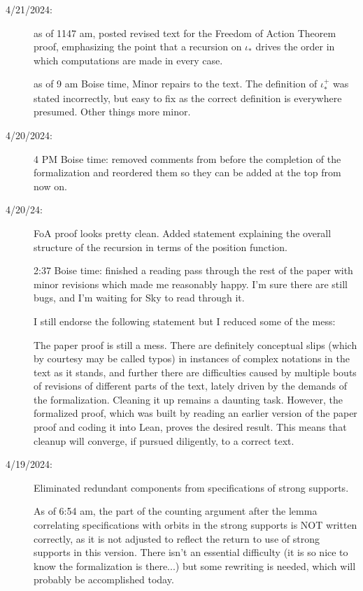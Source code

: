 \documentclass[112pt]{article}
\begin{document}
\begin{description}
\item[4/21/2024:]  as of 1147 am, posted revised text for the Freedom of Action Theorem proof, emphasizing the point that a recursion on $\iota_*$ drives the order in which computations are made in every case.

as of 9 am Boise time, Minor repairs to the text.  The definition of $\iota_*^+$ was stated incorrectly, but easy to fix as the correct definition is everywhere presumed.  Other things more minor.

\item[4/20/2024:] 4 PM Boise time:  removed comments from before the completion of the formalization and reordered them so they can be added at the top from now on.

\item[4/20/24:]  FoA proof looks pretty clean.  Added statement explaining the overall structure of the recursion in terms of the position function.

2:37 Boise time:  finished a reading pass through the rest of the paper with minor revisions which made me reasonably happy.  I'm sure there are still bugs, and I'm waiting for Sky to read through it.

I still endorse the following statement but I reduced some of the mess:

The paper proof is still a mess.  There are definitely conceptual slips (which by courtesy may be called typos) in instances of complex notations in the text as it stands, and further there are difficulties caused by multiple bouts of revisions of different parts of the text, lately driven by the demands of the formalization.
Cleaning it up remains a daunting task.  However, the formalized proof, which was built by reading an earlier version of the paper proof and coding it into Lean, proves the desired result.  This means that cleanup will converge, if pursued diligently, to a correct text.

\item[4/19/2024:]  Eliminated redundant components from specifications of strong supports.

As of 6:54 am, the part of the counting argument after the lemma correlating specifications with orbits in the strong supports is NOT written correctly, as it is not adjusted to reflect the return to use of strong supports
in this version.  There isn't an essential difficulty (it is so nice to know the formalization is there...)  but some rewriting is needed, which will probably be accomplished today.


\end{description}
\end{document}
